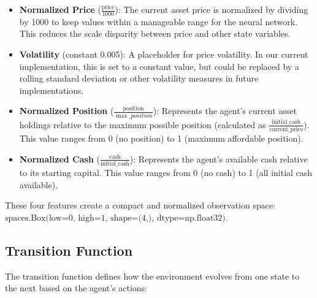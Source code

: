\documentclass[11pt]{article}
\begin{document}
\begin{itemize}
  \item \textbf{Normalized Price} (\(\frac{\text{price}}{1000}\)): The current asset price is normalized by dividing by 1000 to keep values within a manageable range for the neural network. This reduces the scale disparity between price and other state variables.
  
  \item \textbf{Volatility} (constant 0.005): A placeholder for price volatility. In our current implementation, this is set to a constant value, but could be replaced by a rolling standard deviation or other volatility measures in future implementations.
  
  \item \textbf{Normalized Position} (\(\frac{\text{position}}{\max\_position}\)): Represents the agent's current asset holdings relative to the maximum possible position (calculated as \(\frac{\text{initial\_cash}}{\text{current\_price}}\)). This value ranges from 0 (no position) to 1 (maximum affordable position).
  
  \item \textbf{Normalized Cash} (\(\frac{\text{cash}}{\text{initial\_cash}}\)): Represents the agent's available cash relative to its starting capital. This value ranges from 0 (no cash) to 1 (all initial cash available).
\end{itemize}

These four features create a compact and normalized observation space: \(\text{spaces.Box(low=0, high=1, shape=(4,), dtype=np.float32)}\).

\subsection{Transition Function}
The transition function defines how the environment evolves from one state to the next based on the agent's actions:
\end{document}
